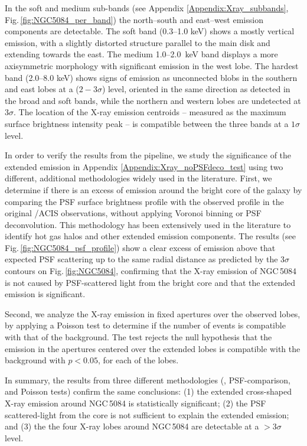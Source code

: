 \documentclass[modern]{CORE-AAS/aastex631}
\begin{document}
In the soft and medium sub-bands (see Appendix \ref{Appendix:Xray_subbands}, Fig.\,\ref{fig:NGC5084_per_band}) the north--south and east--west emission components are detectable. The soft band (0.3--1.0 keV) shows a mostly vertical emission, with a slightly distorted structure parallel to the main disk and extending towards the east. The medium 1.0--2.0~keV band displays a more axisymmetric morphology with significant emission in the west lobe. The hardest band (2.0--8.0 keV) shows signs of emission as unconnected blobs in the southern and east lobes at a ($2-3\sigma$) level, oriented in the same direction as detected in the broad and soft bands, while the northern and western lobes are undetected at $3\sigma$. The location of the X-ray emission centroids -- measured as the maximum surface brightness intensity peak -- is compatible between the three bands at a $1\sigma$ level.


In order to verify the results from the pipeline, we study the significance of the extended emission in Appendix \ref{Appendix:Xray_noPSFdeco_test} using two different, additional methodologies widely used in the literature. First, we determine if there is an excess of emission around the bright core of the galaxy by comparing the PSF surface brightness profile with the observed profile in the original \Chandra/ACIS observations, without applying Voronoi binning or PSF deconvolution. This methodology has been extensively used in the literature \citep{fabbiano+2017apj842_4,fabbiano+2018apj855_131, jones+2020apj891_133,ma+2020apj900_164,ma+2023apj948_61} to identify hot gas halos and other extended emission components. The results (see Fig.\,\ref{fig:NGC5084_psf_profile}) show a clear excess of emission above that expected PSF scattering up to the same radial distance as predicted by the $3\sigma$ contours on Fig.\,\ref{fig:NGC5084}, confirming that the X-ray emission of NGC\,5084 is not caused by PSF-scattered light from the bright core and that the extended emission is significant.

Second, we analyze the X-ray emission in fixed apertures over the observed lobes, by applying a Poisson test \citep{KRISHNAMOORTHY200423} to determine if the number of events is compatible with that of the background. The test rejects the null hypothesis that the emission in the apertures centered over the extended lobes is compatible with the background with $p<0.05$, for each of the lobes.

In summary, the results from three different methodologies (\SAUNAS, PSF-comparison, and Poisson tests) confirm the same conclusions: (1) the extended cross-shaped X-ray emission around NGC\,5084 is statistically significant; (2) the PSF scattered-light from the core is not sufficient to explain the extended emission; and (3) the the four X-ray lobes around NGC\,5084 are detectable at a $>3\sigma$ level.
\end{document}
